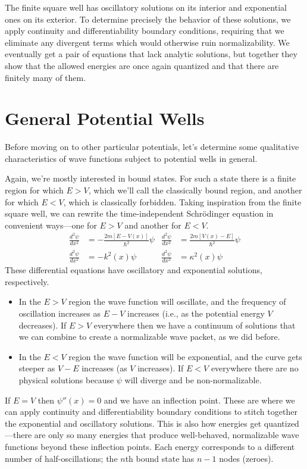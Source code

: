 \documentclass[../p052main.tex]{subfiles}
\begin{document}
\begin{summary}
    The finite square well has oscillatory solutions on its interior and exponential ones on its exterior.
    To determine precisely the behavior of these solutions, we apply continuity and differentiability boundary conditions, requiring that we eliminate any divergent terms which would otherwise ruin normalizability.
    We eventually get a pair of equations that lack analytic solutions, but together they show that the allowed energies are once again quantized and that there are finitely many of them. 
\end{summary}

\section{General Potential Wells}
Before moving on to other particular potentials, let's determine some qualitative characteristics of wave functions subject to potential wells in general.

Again, we're mostly interested in bound states.
For such a state there is a finite region for which $E > V$, which we'll call the classically bound region, and another for which $E < V$, which is classically forbidden.
Taking inspiration from the finite square well, we can rewrite the time-independent Schrödinger equation in convenient ways---one for $E > V$ and another for $E < V$.
\begin{align*}
    \frac{d^2 \psi}{d x^2} &= -\frac{2m[E - V(x)]}{\hbar^2} \psi & \frac{d^2 \psi}{d x^2} &= \frac{2m[V(x) - E]}{\hbar^2} \psi \\
    \frac{d^2 \psi}{d x^2} &= -k^2(x) \psi & \frac{d^2 \psi}{d x^2} &= \kappa^2(x) \psi
\end{align*}
These differential equations have oscillatory and exponential solutions, respectively.
\begin{itemize}[topsep=0pt]
    \item In the $E > V$ region the wave function will oscillate, and the frequency of oscillation increases as $E - V$ increases (i.e., as the potential energy $V$ decreases).
    If $E > V$ everywhere then we have a continuum of solutions that we can combine to create a normalizable wave packet, as we did before.

    \item In the $E < V$ region the wave function will be exponential, and the curve gets steeper as $V - E$ increases (as $V$ increases).
    If $E < V$ everywhere there are no physical solutions because $\psi$ will diverge and be non-normalizable.
\end{itemize}
If $E = V$ then $\psi''(x) = 0$ and we have an inflection point.
These are where we can apply continuity and differentiability boundary conditions to stitch together the exponential and oscillatory solutions.
This is also how energies get quantized---there are only so many energies that produce well-behaved, normalizable wave functions beyond these inflection points.
Each energy corresponds to a different number of half-oscillations; the $n$th bound state has $n-1$ nodes (zeroes).
\end{document}
